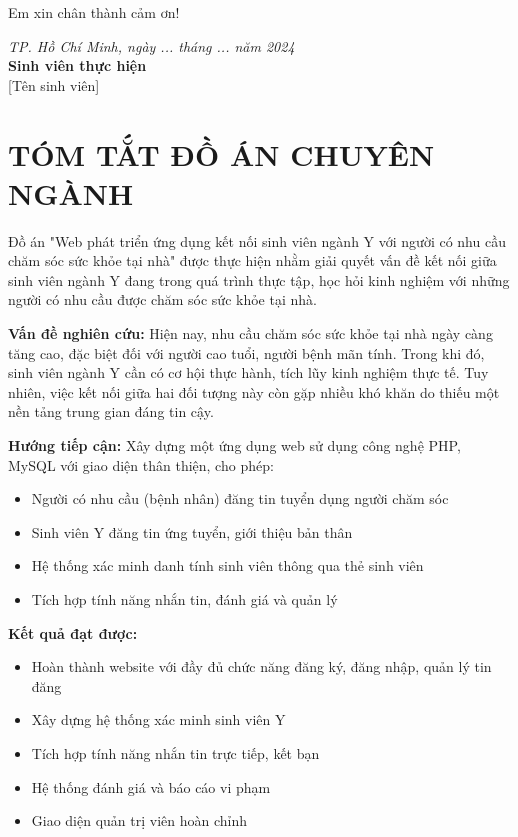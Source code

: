 \documentclass[12pt,a4paper]{report}
\begin{document}
Em xin chân thành cảm ơn!

\vspace{1cm}
\begin{flushright}
\textit{TP. Hồ Chí Minh, ngày ... tháng ... năm 2024}\\
\textbf{Sinh viên thực hiện}\\[1cm]
[Tên sinh viên]
\end{flushright}

\tableofcontents
\newpage

\listoffigures
{}
\newpage

\listoftables
{}
\newpage

\chapter*{TÓM TẮT ĐỒ ÁN CHUYÊN NGÀNH}

Đồ án "Web phát triển ứng dụng kết nối sinh viên ngành Y với người có nhu cầu chăm sóc sức khỏe tại nhà" được thực hiện nhằm giải quyết vấn đề kết nối giữa sinh viên ngành Y đang trong quá trình thực tập, học hỏi kinh nghiệm với những người có nhu cầu được chăm sóc sức khỏe tại nhà.

\textbf{Vấn đề nghiên cứu:} Hiện nay, nhu cầu chăm sóc sức khỏe tại nhà ngày càng tăng cao, đặc biệt đối với người cao tuổi, người bệnh mãn tính. Trong khi đó, sinh viên ngành Y cần có cơ hội thực hành, tích lũy kinh nghiệm thực tế. Tuy nhiên, việc kết nối giữa hai đối tượng này còn gặp nhiều khó khăn do thiếu một nền tảng trung gian đáng tin cậy.

\textbf{Hướng tiếp cận:} Xây dựng một ứng dụng web sử dụng công nghệ PHP, MySQL với giao diện thân thiện, cho phép:
\begin{itemize}
    \item Người có nhu cầu (bệnh nhân) đăng tin tuyển dụng người chăm sóc
    \item Sinh viên Y đăng tin ứng tuyển, giới thiệu bản thân
    \item Hệ thống xác minh danh tính sinh viên thông qua thẻ sinh viên
    \item Tích hợp tính năng nhắn tin, đánh giá và quản lý
\end{itemize}

\textbf{Kết quả đạt được:}
\begin{itemize}
    \item Hoàn thành website với đầy đủ chức năng đăng ký, đăng nhập, quản lý tin đăng
    \item Xây dựng hệ thống xác minh sinh viên Y
    \item Tích hợp tính năng nhắn tin trực tiếp, kết bạn
    \item Hệ thống đánh giá và báo cáo vi phạm
    \item Giao diện quản trị viên hoàn chỉnh
\end{itemize}
\end{document}
